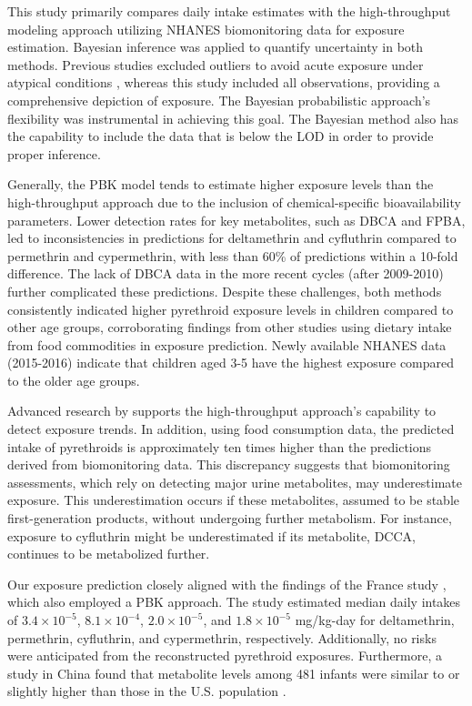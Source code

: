\documentclass[toxics,article,submit,pdftex,moreauthors]{Definitions/mdpi}
\begin{document}
This study primarily compares daily intake estimates with the
high-throughput modeling approach utilizing NHANES biomonitoring data
for exposure estimation. Bayesian inference was applied to quantify
uncertainty in both methods. Previous studies excluded outliers to
avoid acute exposure under atypical conditions
\citep{bao2020association}, whereas this study included all observations,
providing a comprehensive depiction of exposure. The Bayesian
probabilistic approach's flexibility was instrumental in achieving this
goal. The Bayesian method also has the capability to include the data
that is below the LOD in order to provide proper inference.

Generally, the PBK model tends to estimate higher exposure levels than the
high-throughput approach due to the inclusion of chemical-specific
bioavailability parameters. Lower detection rates for key metabolites,
such as DBCA and FPBA, led to inconsistencies in predictions for
deltamethrin and cyfluthrin compared to permethrin and cypermethrin,
with less than 60\% of predictions within a 10-fold difference. The lack
of DBCA data in the more recent cycles (after 2009-2010) further complicated
these predictions. Despite these challenges, both methods consistently
indicated higher pyrethroid exposure levels in children compared to
other age groups, corroborating findings from other studies using
dietary intake from food commodities in exposure prediction. Newly
available NHANES data (2015-2016) indicate that children aged 3-5 have the highest
exposure compared to the older age groups.

Advanced research by \citet{stanfield2024characterizing} supports the
high-throughput approach's capability to detect exposure trends. In
addition, using food consumption data, the predicted intake of
pyrethroids is approximately ten times higher than the predictions
derived from biomonitoring data. This discrepancy suggests that
biomonitoring assessments, which rely on detecting major urine
metabolites, may underestimate exposure. This underestimation occurs if
these metabolites, assumed to be stable first-generation products,
without undergoing further metabolism. For instance, exposure to
cyfluthrin might be underestimated if its metabolite, DCCA, continues to
be metabolized further.

Our exposure prediction closely aligned with the findings of the France study
\citep{quindroit2021estimating}, which also employed a PBK approach. 
The study estimated median daily intakes of \(3.4 \times 10^{-5}\), \(8.1 \times
10^{-4}\), \(2.0 \times 10^{-5}\), and \(1.8 \times 10^{-5}\) mg/kg-day for
deltamethrin, permethrin, cyfluthrin, and cypermethrin, respectively.
Additionally, no risks were anticipated from the reconstructed pyrethroid
exposures. Furthermore, a study in China found that metabolite levels among 481
infants were similar to or slightly higher than those in the U.S. population
\citep{wu2013urinary}.
\end{document}
